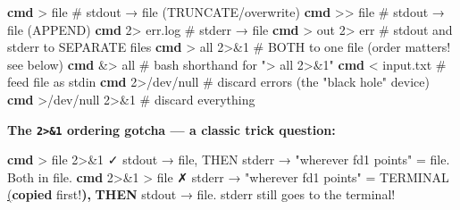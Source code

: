 \documentclass[11pt]{article}
\newenvironment{Shaded}{\begin{snugshade}}{\end{snugshade}}
\newcommand{\CommentTok}[1]{\textcolor[rgb]{0.48,0.49,0.49}{#1}}
\newcommand{\DecValTok}[1]{\textcolor[rgb]{0.96,0.45,0.00}{#1}}
\newcommand{\ErrorTok}[1]{\textcolor[rgb]{0.85,0.27,0.33}{\underline{#1}}}
\newcommand{\ExtensionTok}[1]{\textcolor[rgb]{0.00,0.60,1.00}{\textbf{#1}}}
\newcommand{\KeywordTok}[1]{\textcolor[rgb]{0.81,0.81,0.76}{\textbf{#1}}}
\newcommand{\NormalTok}[1]{\textcolor[rgb]{0.81,0.81,0.76}{#1}}
\newcommand{\OperatorTok}[1]{\textcolor[rgb]{0.81,0.81,0.76}{#1}}
\newcommand{\StringTok}[1]{\textcolor[rgb]{0.96,0.31,0.31}{#1}}
\begin{document}
\begin{Shaded}
\begin{Highlighting}[]
\ExtensionTok{cmd} \OperatorTok{\textgreater{}}\NormalTok{ file        }\CommentTok{\# stdout → file (TRUNCATE/overwrite)}
\ExtensionTok{cmd} \OperatorTok{\textgreater{}\textgreater{}}\NormalTok{ file       }\CommentTok{\# stdout → file (APPEND)}
\ExtensionTok{cmd} \DecValTok{2}\OperatorTok{\textgreater{}}\NormalTok{ err.log    }\CommentTok{\# stderr → file}
\ExtensionTok{cmd} \OperatorTok{\textgreater{}}\NormalTok{ out }\DecValTok{2}\OperatorTok{\textgreater{}}\NormalTok{ err  }\CommentTok{\# stdout and stderr to SEPARATE files}
\ExtensionTok{cmd} \OperatorTok{\textgreater{}}\NormalTok{ all }\DecValTok{2}\OperatorTok{\textgreater{}\&}\DecValTok{1}    \CommentTok{\# BOTH to one file (order matters! see below)}
\ExtensionTok{cmd} \OperatorTok{\&\textgreater{}}\NormalTok{ all        }\CommentTok{\# bash shorthand for "\textgreater{} all 2\textgreater{}\&1"}
\ExtensionTok{cmd} \OperatorTok{\textless{}}\NormalTok{ input.txt   }\CommentTok{\# feed file as stdin}
\ExtensionTok{cmd} \DecValTok{2}\OperatorTok{\textgreater{}}\NormalTok{/dev/null   }\CommentTok{\# discard errors (the "black hole" device)}
\ExtensionTok{cmd} \OperatorTok{\textgreater{}}\NormalTok{/dev/null }\DecValTok{2}\OperatorTok{\textgreater{}\&}\DecValTok{1}  \CommentTok{\# discard everything}
\end{Highlighting}
\end{Shaded}

\textbf{The \texttt{2\textgreater{}\&1} ordering gotcha --- a classic trick question:}


\begin{Shaded}
\begin{Highlighting}[]
\ExtensionTok{cmd} \OperatorTok{\textgreater{}}\NormalTok{ file }\DecValTok{2}\OperatorTok{\textgreater{}\&}\DecValTok{1}\NormalTok{      ✓  stdout → file, THEN stderr → }\StringTok{"wherever fd1 points"}\NormalTok{ = file. Both in file.}
\ExtensionTok{cmd} \DecValTok{2}\OperatorTok{\textgreater{}\&}\DecValTok{1} \OperatorTok{\textgreater{}}\NormalTok{ file      ✗  stderr → }\StringTok{"wherever fd1 points"}\NormalTok{ = TERMINAL }\ErrorTok{(}\ExtensionTok{copied}\NormalTok{ first!}\KeywordTok{)}\ExtensionTok{,}
                        \ExtensionTok{THEN}\NormalTok{ stdout → file. stderr still goes to the terminal!}
\end{Highlighting}
\end{Shaded}
\end{document}
